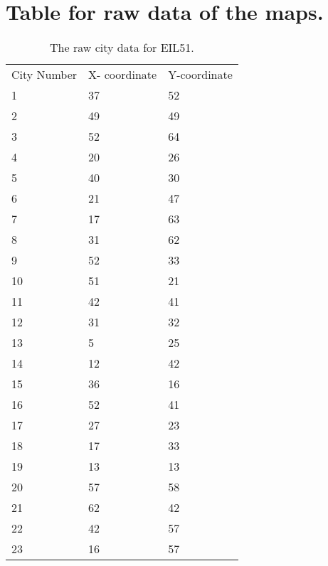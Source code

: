 \chapter{Table for raw data of the maps.}
\label{chap:appendix}

\begin{longtable}[c]{ p{} p{} p{} } 
	\caption{The raw city data for EIL51.} \\   
	\label{longtable:EIL51Data}
			City Number & X- coordinate & Y-coordinate \\
			1           & 37            & 52           \\
			2           & 49            & 49           \\
			3           & 52            & 64           \\
			4           & 20            & 26           \\
			5           & 40            & 30           \\
			6           & 21            & 47           \\
			7           & 17            & 63           \\
			8           & 31            & 62           \\
			9           & 52            & 33           \\
			10          & 51            & 21           \\
			11          & 42            & 41           \\
			12          & 31            & 32           \\
			13          & 5             & 25           \\
			14          & 12            & 42           \\
			15          & 36            & 16           \\
			16          & 52            & 41           \\
			17          & 27            & 23           \\
			18          & 17            & 33           \\
			19          & 13            & 13           \\
			20          & 57            & 58           \\
			21          & 62            & 42           \\
			22          & 42            & 57           \\
			23          & 16            & 57           \\

\end{longtable}
